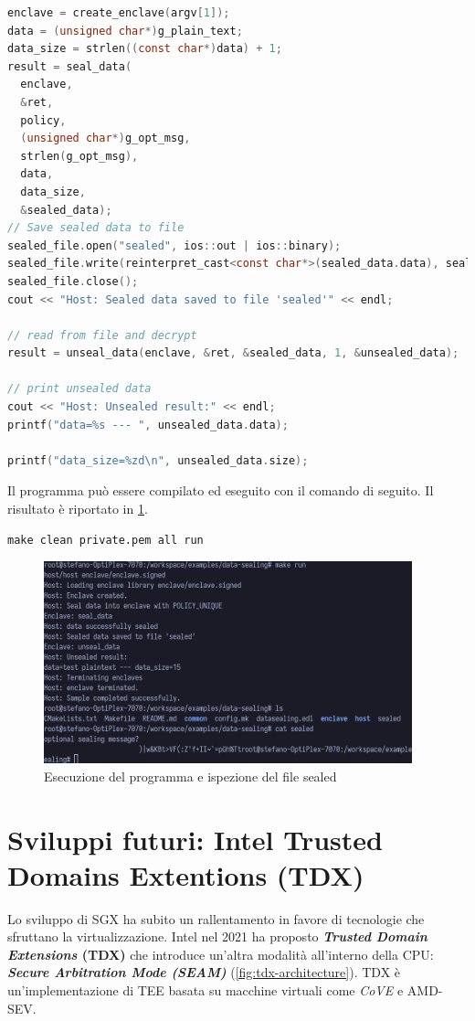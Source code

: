 \documentclass{article}
\begin{document}
\begin{lstlisting}[language=c,caption=Codice host che effettua il sealing e unsealing dei dati,label=lst:host-data-sealing]
enclave = create_enclave(argv[1]);
data = (unsigned char*)g_plain_text;
data_size = strlen((const char*)data) + 1;
result = seal_data(
  enclave,
  &ret,
  policy,
  (unsigned char*)g_opt_msg,
  strlen(g_opt_msg),
  data,
  data_size,
  &sealed_data);
// Save sealed data to file
sealed_file.open("sealed", ios::out | ios::binary);
sealed_file.write(reinterpret_cast<const char*>(sealed_data.data), sealed_data.size);
sealed_file.close();
cout << "Host: Sealed data saved to file 'sealed'" << endl;

// read from file and decrypt
result = unseal_data(enclave, &ret, &sealed_data, 1, &unsealed_data);

// print unsealed data
cout << "Host: Unsealed result:" << endl;
printf("data=%s --- ", unsealed_data.data);

printf("data_size=%zd\n", unsealed_data.size);
\end{lstlisting}

Il programma può essere compilato ed eseguito con il comando di seguito. Il risultato è riportato in \cref{fig:oe-seal-data-example}.
\begin{verbatim}
make clean private.pem all run
\end{verbatim}

\begin{figure}
  \begin{center}
    \includegraphics[width=0.95\textwidth]{figures/ch3/oe-data-sealing-example.png}
  \end{center}
  \caption{Esecuzione del programma e ispezione del file sealed}\label{fig:oe-seal-data-example}
\end{figure}

\clearpage
\section{Sviluppi futuri: Intel Trusted Domains Extentions (TDX)}
Lo sviluppo di SGX ha subito un rallentamento in favore di tecnologie che sfruttano la virtualizzazione. Intel nel 2021 ha proposto \textbf{\textit{Trusted Domain Extensions } (TDX)} che introduce un'altra modalità all'interno della CPU: \textbf{\textit{Secure Arbitration Mode (SEAM)}} (\cref{fig:tdx-architecture}). TDX è un'implementazione di TEE basata su macchine virtuali come \textit{CoVE} e AMD-SEV.
\end{document}
